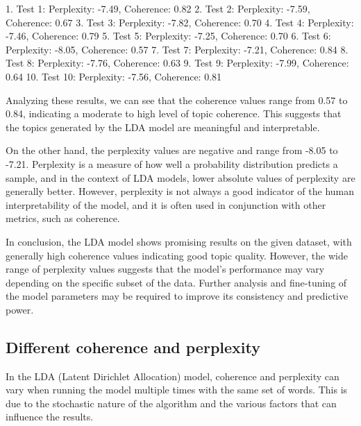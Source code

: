 \documentclass[10pt]{article} %
\begin{document}
	1. Test 1: Perplexity: -7.49, Coherence: 0.82
	2. Test 2: Perplexity: -7.59, Coherence: 0.67
	3. Test 3: Perplexity: -7.82, Coherence: 0.70
	4. Test 4: Perplexity: -7.46, Coherence: 0.79
	5. Test 5: Perplexity: -7.25, Coherence: 0.70
	6. Test 6: Perplexity: -8.05, Coherence: 0.57
	7. Test 7: Perplexity: -7.21, Coherence: 0.84
	8. Test 8: Perplexity: -7.76, Coherence: 0.63
	9. Test 9: Perplexity: -7.99, Coherence: 0.64
	10. Test 10: Perplexity: -7.56, Coherence: 0.81
	
	Analyzing these results, we can see that the coherence values range from 0.57 to 0.84, indicating a moderate to high level of topic coherence. This suggests that the topics generated by the LDA model are meaningful and interpretable. 
	
	On the other hand, the perplexity values are negative and range from -8.05 to -7.21. Perplexity is a measure of how well a probability distribution predicts a sample, and in the context of LDA models, lower absolute values of perplexity are generally better. However, perplexity is not always a good indicator of the human interpretability of the model, and it is often used in conjunction with other metrics, such as coherence.
	
	In conclusion, the LDA model shows promising results on the given dataset, with generally high coherence values indicating good topic quality. However, the wide range of perplexity values suggests that the model's performance may vary depending on the specific subset of the data. Further analysis and fine-tuning of the model parameters may be required to improve its consistency and predictive power.
	
	\subsection{Different coherence and perplexity}
	In the LDA (Latent Dirichlet Allocation) model, coherence and perplexity can vary when running the model multiple times with the same set of words. This is due to the stochastic nature of the algorithm and the various factors that can influence the results.
	
\end{document}
